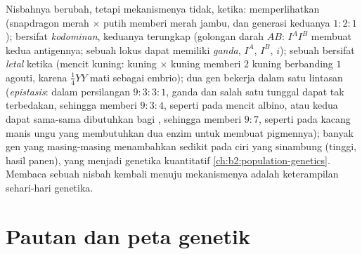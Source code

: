 \begin{proposition}\label{prop:b2:meiosis-heredity:extensions}
Nisbahnya berubah, tetapi mekanismenya tidak, ketika: 
memperlihatkan \emph{} (snapdragon merah $\times$
putih memberi merah jambu, dan generasi keduanya $1 : 2 : 1$); 
bersifat \emph{kodominan}, keduanya terungkap (golongan darah $AB$:
 $I^AI^B$ membuat kedua antigennya; sebuah lokus dapat
memiliki \emph{ ganda}, $I^A$, $I^B$, $i$); sebuah  bersifat
\emph{letal} ketika  (mencit kuning: kuning $\times$ kuning
memberi $2$ kuning berbanding $1$ agouti, karena $\tfrac14 YY$ mati
sebagai embrio); dua gen bekerja dalam satu lintasan
(\emph{epistasis}: dalam persilangan $9 : 3 : 3 : 1$,  ganda
dan salah satu  tunggal dapat tak terbedakan, sehingga memberi
$9 : 3 : 4$, seperti pada mencit albino, atau kedua  dapat
sama-sama dibutuhkan bagi , sehingga memberi $9 : 7$,
seperti pada kacang manis ungu yang membutuhkan dua enzim untuk membuat
pigmennya); banyak gen yang masing-masing menambahkan sedikit pada ciri
yang sinambung (tinggi, hasil panen), yang menjadi genetika kuantitatif
\cref{ch:b2:population-genetics}. Membaca sebuah nisbah kembali menuju
mekanismenya adalah keterampilan sehari-hari genetika.
\end{proposition}

\section{Pautan dan peta genetik}

